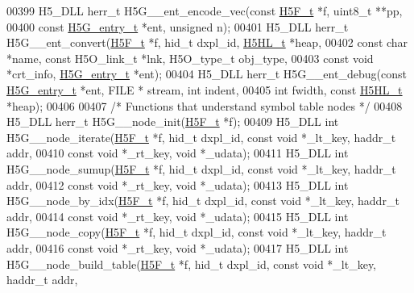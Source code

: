 \begin{DoxyCode}
00399 H5\_DLL herr\_t H5G\_\_ent\_encode\_vec(\textcolor{keyword}{const} \hyperlink{struct_h5_f__t}{H5F\_t} *f, uint8\_t **pp,
00400                   \textcolor{keyword}{const} \hyperlink{struct_h5_g__entry__t}{H5G\_entry\_t} *ent, \textcolor{keywordtype}{unsigned} n);
00401 H5\_DLL herr\_t H5G\_\_ent\_convert(\hyperlink{struct_h5_f__t}{H5F\_t} *f, hid\_t dxpl\_id, \hyperlink{struct_h5_h_l__t}{H5HL\_t} *heap,
00402     \textcolor{keyword}{const} \textcolor{keywordtype}{char} *name, \textcolor{keyword}{const} H5O\_link\_t *lnk, H5O\_type\_t obj\_type,
00403     \textcolor{keyword}{const} \textcolor{keywordtype}{void} *crt\_info, \hyperlink{struct_h5_g__entry__t}{H5G\_entry\_t} *ent);
00404 H5\_DLL herr\_t H5G\_\_ent\_debug(\textcolor{keyword}{const} \hyperlink{struct_h5_g__entry__t}{H5G\_entry\_t} *ent, FILE * stream, \textcolor{keywordtype}{int} indent,
00405     \textcolor{keywordtype}{int} fwidth, \textcolor{keyword}{const} \hyperlink{struct_h5_h_l__t}{H5HL\_t} *heap);
00406 
00407 \textcolor{comment}{/* Functions that understand symbol table nodes */}
00408 H5\_DLL herr\_t H5G\_\_node\_init(\hyperlink{struct_h5_f__t}{H5F\_t} *f);
00409 H5\_DLL \textcolor{keywordtype}{int} H5G\_\_node\_iterate(\hyperlink{struct_h5_f__t}{H5F\_t} *f, hid\_t dxpl\_id, \textcolor{keyword}{const} \textcolor{keywordtype}{void} *\_lt\_key, haddr\_t addr,
00410              \textcolor{keyword}{const} \textcolor{keywordtype}{void} *\_rt\_key, \textcolor{keywordtype}{void} *\_udata);
00411 H5\_DLL \textcolor{keywordtype}{int} H5G\_\_node\_sumup(\hyperlink{struct_h5_f__t}{H5F\_t} *f, hid\_t dxpl\_id, \textcolor{keyword}{const} \textcolor{keywordtype}{void} *\_lt\_key, haddr\_t addr,
00412              \textcolor{keyword}{const} \textcolor{keywordtype}{void} *\_rt\_key, \textcolor{keywordtype}{void} *\_udata);
00413 H5\_DLL \textcolor{keywordtype}{int} H5G\_\_node\_by\_idx(\hyperlink{struct_h5_f__t}{H5F\_t} *f, hid\_t dxpl\_id, \textcolor{keyword}{const} \textcolor{keywordtype}{void} *\_lt\_key, haddr\_t addr,
00414              \textcolor{keyword}{const} \textcolor{keywordtype}{void} *\_rt\_key, \textcolor{keywordtype}{void} *\_udata);
00415 H5\_DLL \textcolor{keywordtype}{int} H5G\_\_node\_copy(\hyperlink{struct_h5_f__t}{H5F\_t} *f, hid\_t dxpl\_id, \textcolor{keyword}{const} \textcolor{keywordtype}{void} *\_lt\_key, haddr\_t addr,
00416              \textcolor{keyword}{const} \textcolor{keywordtype}{void} *\_rt\_key, \textcolor{keywordtype}{void} *\_udata);
00417 H5\_DLL \textcolor{keywordtype}{int} H5G\_\_node\_build\_table(\hyperlink{struct_h5_f__t}{H5F\_t} *f, hid\_t dxpl\_id, \textcolor{keyword}{const} \textcolor{keywordtype}{void} *\_lt\_key, haddr\_t addr,

\end{DoxyCode}
